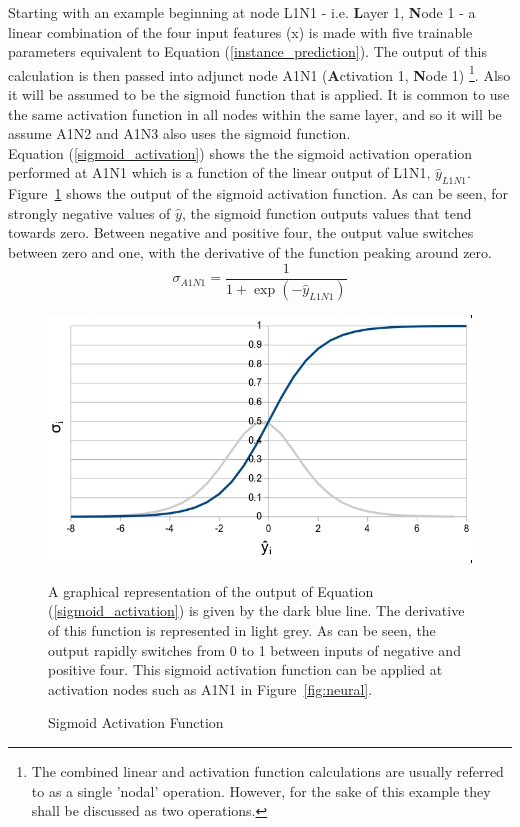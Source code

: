 \noindent
Starting with an example beginning at node L1N1 - i.e. \textbf{L}ayer 1, \textbf{N}ode 1 - a linear combination of the four input features (x) is made with five trainable parameters equivalent to Equation (\ref{instance_prediction}). The output of this calculation is then passed into adjunct node A1N1 (\textbf{A}ctivation 1, \textbf{N}ode 1) \footnote{The combined linear and activation function calculations are usually referred to as a single 'nodal' operation. However, for the sake of this example they shall be discussed as two operations.}. Also it will be assumed to be the sigmoid function \cite{pratiwi2020sigmoid} that is applied. It is common to use the same activation function in all nodes within the same layer, and so it will be assume A1N2 and A1N3 also uses the sigmoid function.\\

\noindent
Equation (\ref{sigmoid_activation}) shows the the sigmoid activation operation performed at A1N1 which is a function of the linear output of L1N1, $\hat{y}_{L1N1}$.  Figure~\ref{fig:sigmoid} shows the output of the sigmoid activation function. As can be seen, for strongly negative values of $\hat{y}$, the sigmoid function outputs values that tend towards zero. Between negative and positive four, the output value switches between zero and one, with the derivative of the function peaking around zero. \\ 

\begin{equation} \label{sigmoid_activation}
	\sigma_{A1N1} = \frac{1}{1 + \exp(-\hat{y}_{L1N1})}
\end{equation}

\begin{figure}[p]
	\centering
	\includegraphics[scale=0.5]{Figures/Sigmoid.jpg}
	\caption{Sigmoid Activation Function} {A graphical representation of the output of Equation (\ref{sigmoid_activation}) is given by the dark blue line. The derivative of this function is represented in light grey. As can be seen, the output rapidly switches from 0 to 1 between inputs of negative and positive four. This sigmoid activation function can be applied at activation nodes such as A1N1 in Figure~\ref{fig:neural}. }
	\label{fig:sigmoid}
\end{figure}

